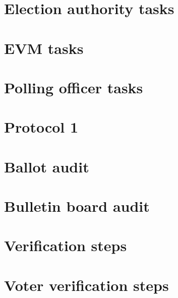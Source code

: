 \let\mypdfximage\pdfximage\def\pdfximage{\immediate\mypdfximage}\documentclass[twoside]{book}
\newcommand{\+}{\discretionary{\mbox{\scriptsize$\hookleftarrow$}}{}{}}
\begin{document}
\chapter{Election authority tasks}
\label{md_src_protocol_ea__r_e_a_d_m_e}

\chapter{E\+VM tasks}
\label{md_src_protocol_evm__r_e_a_d_m_e}

\chapter{Polling officer tasks}
\label{md_src_protocol_po__r_e_a_d_m_e}

\chapter{Protocol 1}
\label{md_src_protocol__r_e_a_d_m_e}

\chapter{Ballot audit}
\label{md_src_protocol_verif_ballotaudit__r_e_a_d_m_e}

\chapter{Bulletin board audit}
\label{md_src_protocol_verif_bbaudit__r_e_a_d_m_e}

\chapter{Verification steps}
\label{md_src_protocol_verif__r_e_a_d_m_e}

\chapter{Voter verification steps}
\label{md_src_protocol_verif_votercheck__r_e_a_d_m_e}

\end{document}

